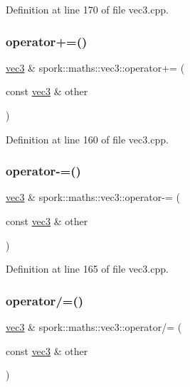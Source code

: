 Definition at line 170 of file vec3.\+cpp.

\mbox{\label{structspork_1_1maths_1_1vec3_a43b3a607009f36bace4c5052d2704722}} 
\subsubsection{\texorpdfstring{operator+=()}{operator+=()}}
{\footnotesize\ttfamily \hyperlink{structspork_1_1maths_1_1vec3}{vec3} \& spork\+::maths\+::vec3\+::operator+= (\begin{DoxyParamCaption}\item[{const \hyperlink{structspork_1_1maths_1_1vec3}{vec3} \&}]{other }\end{DoxyParamCaption})}



Definition at line 160 of file vec3.\+cpp.

\mbox{\label{structspork_1_1maths_1_1vec3_a02ebc782e426799b5d664b796119eb71}} 
\subsubsection{\texorpdfstring{operator-\/=()}{operator-=()}}
{\footnotesize\ttfamily \hyperlink{structspork_1_1maths_1_1vec3}{vec3} \& spork\+::maths\+::vec3\+::operator-\/= (\begin{DoxyParamCaption}\item[{const \hyperlink{structspork_1_1maths_1_1vec3}{vec3} \&}]{other }\end{DoxyParamCaption})}



Definition at line 165 of file vec3.\+cpp.

\mbox{\label{structspork_1_1maths_1_1vec3_a8574d097b6a04613a97c7eabdf315309}} 
\subsubsection{\texorpdfstring{operator/=()}{operator/=()}}
{\footnotesize\ttfamily \hyperlink{structspork_1_1maths_1_1vec3}{vec3} \& spork\+::maths\+::vec3\+::operator/= (\begin{DoxyParamCaption}\item[{const \hyperlink{structspork_1_1maths_1_1vec3}{vec3} \&}]{other }\end{DoxyParamCaption})}



